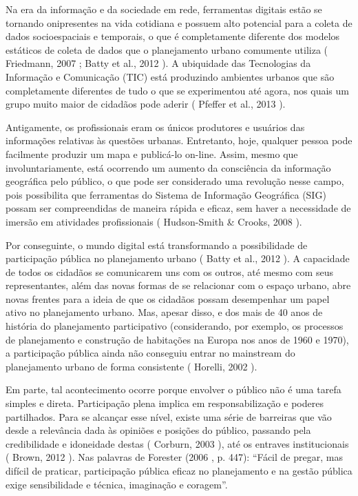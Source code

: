 \documentclass{article}
\begin{document}
Na era da informação e da sociedade em rede, ferramentas digitais estão se tornando
				onipresentes na vida cotidiana e possuem alto potencial para a coleta de dados
				socioespaciais e temporais, o que é completamente diferente dos modelos estáticos de
				coleta de dados que o planejamento urbano comumente utiliza (%
Friedmann, 2007%
; %
Batty et
					al., 2012%
). A ubiquidade das Tecnologias da Informação e Comunicação
				(TIC) está produzindo ambientes urbanos que são completamente diferentes de tudo o
				que se experimentou até agora, nos quais um grupo muito maior de cidadãos pode
				aderir (%
Pfeffer et al., 2013%
).

Antigamente, os profissionais eram os únicos produtores e usuários das informações
				relativas às questões urbanas. Entretanto, hoje, qualquer pessoa pode facilmente
				produzir um mapa e publicá-lo on-line. Assim, mesmo que involuntariamente, está
				ocorrendo um aumento da consciência da informação geográfica pelo público, o que
				pode ser considerado uma revolução nesse campo, pois possibilita que ferramentas do
				Sistema de Informação Geográfica (SIG) possam ser compreendidas de maneira rápida e
				eficaz, sem haver a necessidade de imersão em atividades profissionais (%
Hudson-Smith \& Crooks, 2008%
).

Por conseguinte, o mundo digital está transformando a possibilidade de participação
				pública no planejamento urbano (%
Batty et al.,
					2012%
). A capacidade de todos os cidadãos se comunicarem uns com os
				outros, até mesmo com seus representantes, além das novas formas de se relacionar
				com o espaço urbano, abre novas frentes para a ideia de que os cidadãos possam
				desempenhar um papel ativo no planejamento urbano. Mas, apesar disso, e dos mais de
				40 anos de história do planejamento participativo (considerando, por exemplo, os
				processos de planejamento e construção de habitações na Europa nos anos de 1960 e
				1970), a participação pública ainda não conseguiu entrar no
mainstream%
 do planejamento urbano de forma consistente (%
Horelli, 2002%
).

Em parte, tal acontecimento ocorre porque envolver o público não é uma tarefa simples
				e direta. Participação plena implica em responsabilização e poderes partilhados.
				Para se alcançar esse nível, existe uma série de barreiras que vão desde a
				relevância dada às opiniões e posições do público, passando pela credibilidade e
				idoneidade destas (%
Corburn, 2003%
), até os
				entraves institucionais (%
Brown, 2012%
). Nas
				palavras de %
Forester (2006%
, p. 447): “Fácil
				de pregar, mas difícil de praticar, participação pública eficaz no planejamento e na
				gestão pública exige sensibilidade e técnica, imaginação e coragem”.
\end{document}

